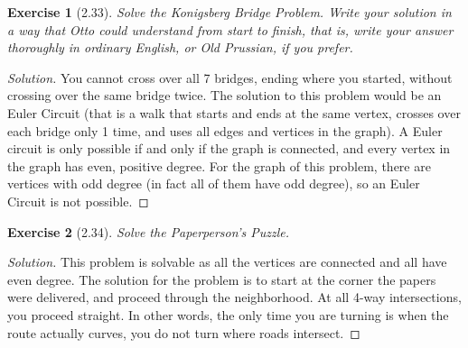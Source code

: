 \documentclass{article}
\newtheorem*{ex}{Exercise}
\newenvironment{solution}
  {\begin{proof}[Solution]}
  {\renewcommand{\qedsymbol}{}\end{proof}}
\begin{document}
\begin{ex}[2.33]
	Solve the Konigsberg Bridge Problem. Write your solution in a way that Otto could understand from start to finish, that is, write your
	answer thoroughly in ordinary English, or Old Prussian, if you prefer.
\end{ex}
\begin{solution}
	You cannot cross over all 7 bridges, ending where you started, without crossing over the same bridge twice. The solution to this problem would be an Euler Circuit (that is a walk that starts
	and ends at the same vertex, crosses over each bridge only 1 time, and uses all edges and vertices in the graph). A Euler circuit is only possible if and only if the graph is connected, and every vertex in 
	the graph has even, positive degree. For the graph of this problem, there are vertices with odd degree (in fact all of them have odd degree), so an Euler Circuit is not possible. 
\end{solution}

\begin{ex}[2.34]
	Solve the Paperperson’s Puzzle.
\end{ex}
\begin{solution}
	This problem is solvable as all the vertices are connected and all have even degree. The solution for the problem is to start at the corner the papers were delivered, and proceed through the neighborhood. At all 4-way
	intersections, you proceed straight. In other words, the only time you are turning is when the route actually curves, you do not turn where roads intersect. 
\end{solution}
\end{document}
